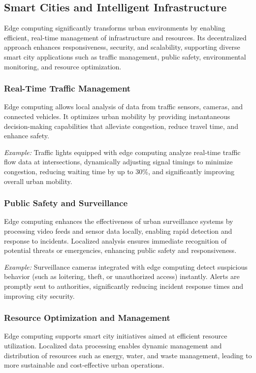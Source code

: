 \documentclass[runningheads]{llncs}
\begin{document}
\subsection{Smart Cities and Intelligent Infrastructure}

Edge computing significantly transforms urban environments by enabling efficient, real-time management of infrastructure and resources. Its decentralized approach enhances responsiveness, security, and scalability, supporting diverse smart city applications such as traffic management, public safety, environmental monitoring, and resource optimization.

\subsubsection{Real-Time Traffic Management}
Edge computing allows local analysis of data from traffic sensors, cameras, and connected vehicles. It optimizes urban mobility by providing instantaneous decision-making capabilities that alleviate congestion, reduce travel time, and enhance safety.

\textit{Example:} Traffic lights equipped with edge computing analyze real-time traffic flow data at intersections, dynamically adjusting signal timings to minimize congestion, reducing waiting time by up to 30\%, and significantly improving overall urban mobility.

\subsubsection{Public Safety and Surveillance}
Edge computing enhances the effectiveness of urban surveillance systems by processing video feeds and sensor data locally, enabling rapid detection and response to incidents. Localized analysis ensures immediate recognition of potential threats or emergencies, enhancing public safety and responsiveness.

\textit{Example:} Surveillance cameras integrated with edge computing detect suspicious behavior (such as loitering, theft, or unauthorized access) instantly. Alerts are promptly sent to authorities, significantly reducing incident response times and improving city security.

\subsubsection{Resource Optimization and Management}
Edge computing supports smart city initiatives aimed at efficient resource utilization. Localized data processing enables dynamic management and distribution of resources such as energy, water, and waste management, leading to more sustainable and cost-effective urban operations.
\end{document}
